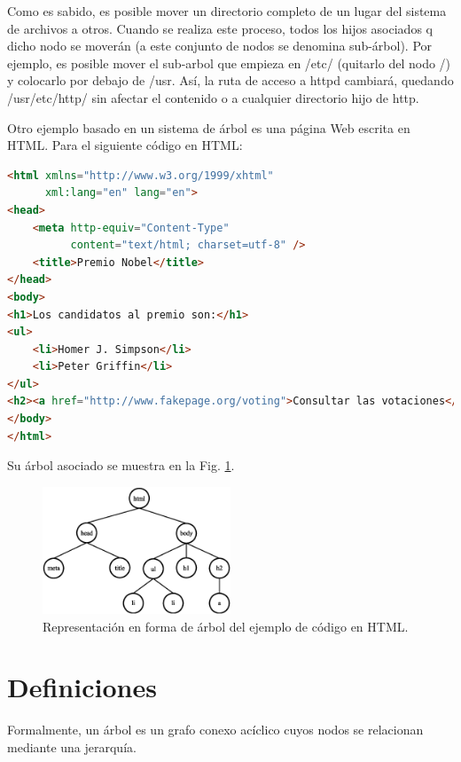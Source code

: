 Como es sabido, es posible mover un directorio completo de un lugar del sistema de archivos a otros. Cuando se realiza este proceso, todos los hijos asociados q dicho nodo se moverán (a este conjunto de nodos se denomina sub-árbol). Por ejemplo, es posible mover el sub-arbol que empieza en /etc/ (quitarlo del nodo /) y colocarlo por debajo de /usr. Así, la ruta de acceso a httpd cambiará, quedando /usr/etc/http/ sin afectar el contenido o a cualquier directorio hijo de http.

Otro ejemplo basado en un sistema de árbol es una página Web escrita en HTML. Para el siguiente código en HTML:

\begin{lstlisting}[upquote=true, language=html]
<html xmlns="http://www.w3.org/1999/xhtml"
      xml:lang="en" lang="en">
<head>
    <meta http-equiv="Content-Type"
          content="text/html; charset=utf-8" />
    <title>Premio Nobel</title>
</head>
<body>
<h1>Los candidatos al premio son:</h1>
<ul>
    <li>Homer J. Simpson</li>
    <li>Peter Griffin</li>
</ul>
<h2><a href="http://www.fakepage.org/voting">Consultar las votaciones</a><h2>
</body>
</html>
\end{lstlisting}

Su árbol asociado se muestra en la Fig. \ref{fig:treeHTML}.

\begin{figure}[htpb!]
  \begin{center}
    \includegraphics[width=0.5\textwidth]{images/treeHTML.eps}
  \end{center}
  \caption{Representación en forma de árbol del ejemplo de código en HTML.}
  \label{fig:treeHTML}
\end{figure}

\section{Definiciones}

Formalmente, un árbol es un grafo conexo acíclico cuyos nodos se relacionan mediante una jerarquía.

